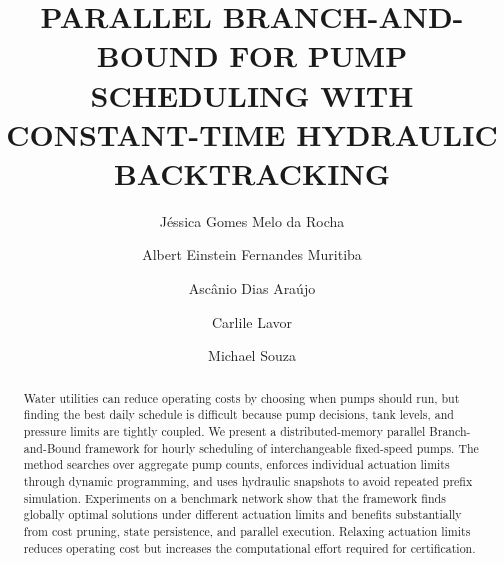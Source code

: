 \documentclass[Journal,letterpaper,InsideFigs]{ascelike-new}
\begin{document}
\title{PARALLEL BRANCH-AND-BOUND FOR PUMP SCHEDULING WITH CONSTANT-TIME HYDRAULIC BACKTRACKING}

\author[1]{Jéssica Gomes Melo da Rocha}
\author[1]{Albert Einstein Fernandes Muritiba}
\author[1,2]{Ascânio Dias Araújo}
\author[3]{Carlile Lavor}
\author[1,3]{Michael Souza}


\maketitle

\begin{abstract}
	Water utilities can reduce operating costs by choosing when pumps should run, but finding the best daily schedule is difficult because pump decisions, tank levels, and pressure limits are tightly coupled. We present a distributed-memory parallel Branch-and-Bound framework for hourly scheduling of interchangeable fixed-speed pumps. The method searches over aggregate pump counts, enforces individual actuation limits through dynamic programming, and uses hydraulic snapshots to avoid repeated prefix simulation. Experiments on a benchmark network show that the framework finds globally optimal solutions under different actuation limits and benefits substantially from cost pruning, state persistence, and parallel execution. Relaxing actuation limits reduces operating cost but increases the computational effort required for certification.
\end{abstract}
\end{document}
